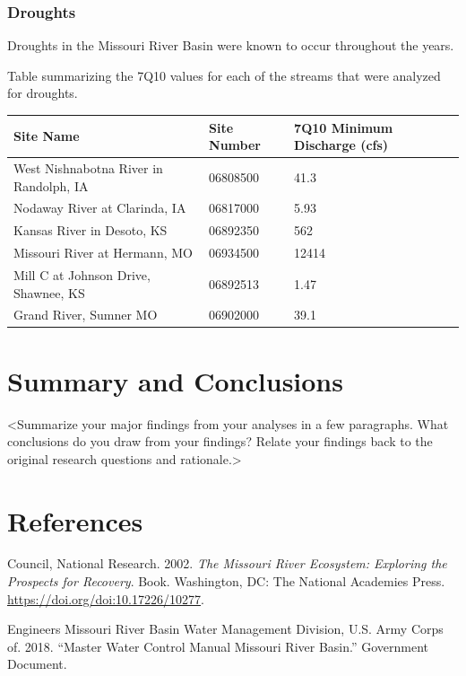 \documentclass[12pt,]{article}
\begin{document}
\hypertarget{droughts}{%
\subsubsection{Droughts}\label{droughts}}

Droughts in the Missouri River Basin were known to occur throughout the
years.

Table summarizing the 7Q10 values for each of the streams that were
analyzed for droughts.

\begin{longtable}[]{@{}lll@{}}
\toprule
Site Name & Site Number & 7Q10 Minimum Discharge (cfs)\tabularnewline
\midrule
\endhead
West Nishnabotna River in Randolph, IA & 06808500 & 41.3\tabularnewline
Nodaway River at Clarinda, IA & 06817000 & 5.93\tabularnewline
Kansas River in Desoto, KS & 06892350 & 562\tabularnewline
Missouri River at Hermann, MO & 06934500 & 12414\tabularnewline
Mill C at Johnson Drive, Shawnee, KS & 06892513 & 1.47\tabularnewline
Grand River, Sumner MO & 06902000 & 39.1\tabularnewline
\bottomrule
\end{longtable}

\newpage

\hypertarget{summary-and-conclusions}{%
\section{Summary and Conclusions}\label{summary-and-conclusions}}

\textless{}Summarize your major findings from your analyses in a few
paragraphs. What conclusions do you draw from your findings? Relate your
findings back to the original research questions and
rationale.\textgreater{}

\newpage

\hypertarget{references}{%
\section*{References}\label{references}}

\hypertarget{refs}{}
\leavevmode\hypertarget{ref-nrc2002}{}%
Council, National Research. 2002. \emph{The Missouri River Ecosystem:
Exploring the Prospects for Recovery}. Book. Washington, DC: The
National Academies Press. \url{https://doi.org/doi:10.17226/10277}.

\leavevmode\hypertarget{ref-usace2018}{}%
Engineers Missouri River Basin Water Management Division, U.S. Army
Corps of. 2018. ``Master Water Control Manual Missouri River Basin.''
Government Document.
\end{document}
